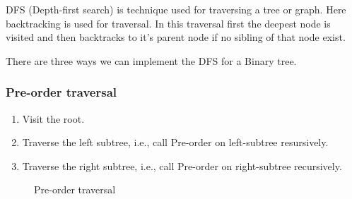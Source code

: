\documentclass[a4paper,11pt]{book}
\begin{document}
\noindent DFS (Depth-first search) is technique used for traversing a tree or graph. Here backtracking is used for traversal. In this traversal first the deepest node is visited and then backtracks to it's parent node if no sibling of that node exist. 


\noindent There are three ways we can implement the DFS for a Binary tree.

\subsubsection{Pre-order traversal}
        \begin{enumerate}
            \item Visit the root.
            \item Traverse the left subtree, i.e., call Pre-order on left-subtree resursively.
            \item Traverse the right subtree, i.e., call Pre-order on right-subtree recursively.
        \end{enumerate}
        \begin{figure}[ht]
        \begin{center}
        \vspace{6mm}

        \end{center}
        \caption{Pre-order traversal}
        \end{figure}
\end{document}
